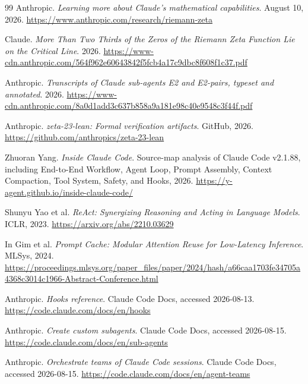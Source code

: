 \begin{thebibliography}{99}
Anthropic. \textit{Learning more about Claude's mathematical capabilities}. August 10, 2026. \url{https://www.anthropic.com/research/riemann-zeta}

Claude. \textit{More Than Two Thirds of the Zeros of the Riemann Zeta Function Lie on the Critical Line}. 2026. \url{https://www-cdn.anthropic.com/564f962e60643842f5fcb4a17c9dbc8f608f1c37.pdf}

Anthropic. \textit{Transcripts of Claude sub-agents E2 and E2-pairs, typeset and annotated}. 2026. \url{https://www-cdn.anthropic.com/8a0d1add3c637b858a9a181e98c40e9548c3f44f.pdf}

Anthropic. \textit{zeta-23-lean: Formal verification artifacts}. GitHub, 2026. \url{https://github.com/anthropics/zeta-23-lean}

Zhuoran Yang. \textit{Inside Claude Code}. Source-map analysis of Claude Code v2.1.88, including End-to-End Workflow, Agent Loop, Prompt Assembly, Context Compaction, Tool System, Safety, and Hooks, 2026. \url{https://y-agent.github.io/inside-claude-code/}

Shunyu Yao et al. \textit{ReAct: Synergizing Reasoning and Acting in Language Models}. ICLR, 2023. \url{https://arxiv.org/abs/2210.03629}

In Gim et al. \textit{Prompt Cache: Modular Attention Reuse for Low-Latency Inference}. MLSys, 2024. \url{https://proceedings.mlsys.org/paper_files/paper/2024/hash/a66caa1703fe34705a4368c3014c1966-Abstract-Conference.html}

Anthropic. \textit{Hooks reference}. Claude Code Docs, accessed 2026-08-13. \url{https://code.claude.com/docs/en/hooks}

Anthropic. \textit{Create custom subagents}. Claude Code Docs, accessed 2026-08-15. \url{https://code.claude.com/docs/en/sub-agents}

Anthropic. \textit{Orchestrate teams of Claude Code sessions}. Claude Code Docs, accessed 2026-08-15. \url{https://code.claude.com/docs/en/agent-teams}
\end{thebibliography}
